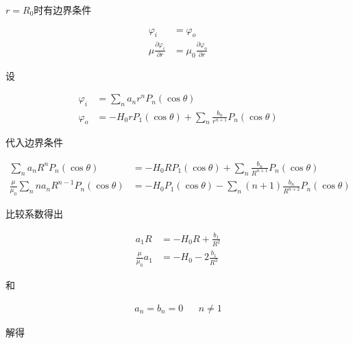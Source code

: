 \documentclass{article}
\begin{document}
$r=R_0$时有边界条件

\begin{equation*}
  \begin{aligned}
    \varphi_i &= \varphi_o \\
    \mu \frac{\partial \varphi_{i}}{\partial r} &= \mu_0 \frac{\partial \varphi_{o}}{\partial r}
  \end{aligned}
\end{equation*}

设

\begin{equation*}
  \begin{aligned}
    \varphi_i &= \sum_n a_n r^n P_n \left( \cos \theta \right) \\
    \varphi_o &= - H_0 r P_1 \left( \cos \theta \right) + \sum_n \frac{b_{n}}{r^{n+1}} P_n \left( \cos \theta \right)
  \end{aligned}
\end{equation*}

代入边界条件

\begin{equation*}
  \begin{aligned}
    \sum_n a_n R^n P_n \left( \cos \theta \right) &= - H_0 R P_1 \left( \cos \theta \right) + \sum_n \frac{b_{n}}{R^{n+1}} P_n \left( \cos \theta \right) \\
    \frac{\mu}{\mu_{0}} \sum_n n a_n R^{n-1} P_n \left( \cos \theta \right) &= - H_0 P_1 \left( \cos \theta \right) - \sum_n \left( n + 1 \right) \frac{b_{n}}{R^{n+2}} P_n \left( \cos \theta \right)
  \end{aligned}
\end{equation*}

比较系数得出

\begin{equation*}
  \begin{aligned}
    a_1 R &= - H_0 R + \frac{b_{1}}{R^{2}} \\
    \frac{\mu}{\mu_{0}} a_1 &= - H_0 - 2 \frac{b_{1}}{R^{3}}
  \end{aligned}
\end{equation*}

和

\begin{equation*}
  \begin{aligned}
    a_n = b_n = 0 && n \neq 1
  \end{aligned}
\end{equation*}

解得
\end{document}
